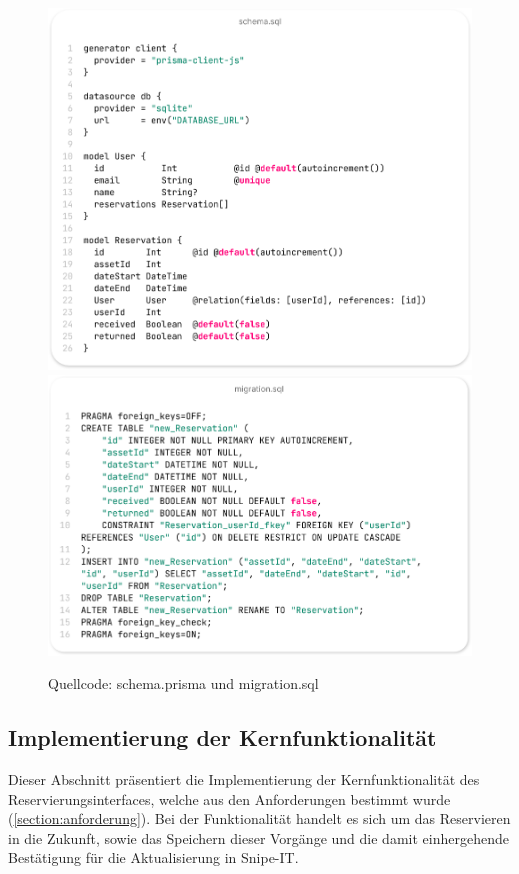 \begin{figure}[p]
  \centering
  \includegraphics[scale=0.35]{Bilder/Code/schemasql.png}
  \includegraphics[scale=0.35]{Bilder/Code/migrationsql.png}
  \caption[Quellcode: schema.prisma und migration.sql]{Quellcode: schema.prisma und migration.sql}
  \label{fig:prisma}
\end{figure}


\subsection{Implementierung der Kernfunktionalität}
\label{subsec:kernfkt}
Dieser Abschnitt präsentiert die Implementierung der Kernfunktionalität des
Reservierungsinterfaces, welche aus den Anforderungen bestimmt wurde (\ref{section:anforderung}).
Bei der Funktionalität handelt es sich um das Reservieren in die Zukunft, sowie das Speichern
dieser Vorgänge und die damit einhergehende Bestätigung für die Aktualisierung in Snipe-IT.


